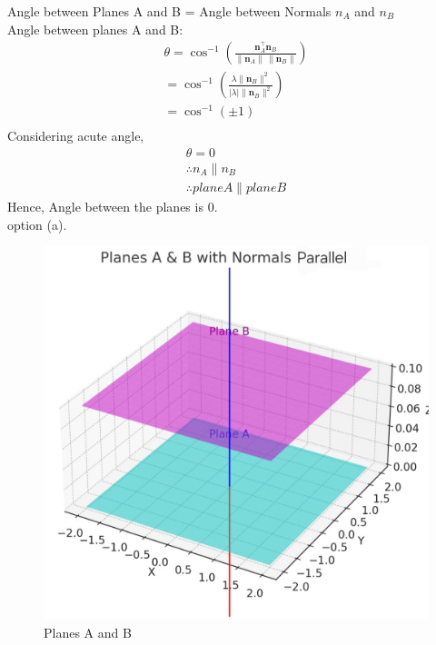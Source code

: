 \documentclass[journal]{IEEEtran}
\begin{document}
Angle between Planes A and B = Angle between Normals $n_A$ and $n_B$\\
Angle between planes A and B:
\begin{align}
\theta = \cos^{-1}\!\left(
\frac{\mathbf{n}_A^\top \mathbf{n}_B}{\|\mathbf{n}_A\|\,\|\mathbf{n}_B\|}
\right)\\
= \cos^{-1}\!\left(
\frac{\lambda\|\mathbf{n}_B\|^2}{|\lambda|\|\mathbf{n}_B\|^2}
\right)\\
= \cos^{-1}(\pm 1)\\
\end{align}
Considering acute angle,
\begin{align}
\theta=0\\
\therefore n_A \parallel n_B\\
\therefore plane A \parallel plane B
\end{align}
Hence, Angle between the planes is $0$.\\option (a).
\begin{figure}[H]
    \centering
    \includegraphics[width=0.75\columnwidth]{figs/graph .jpg}
    \caption{Planes A and B}
    \label{fig:placeholder}
\end{figure}
\end{document}
